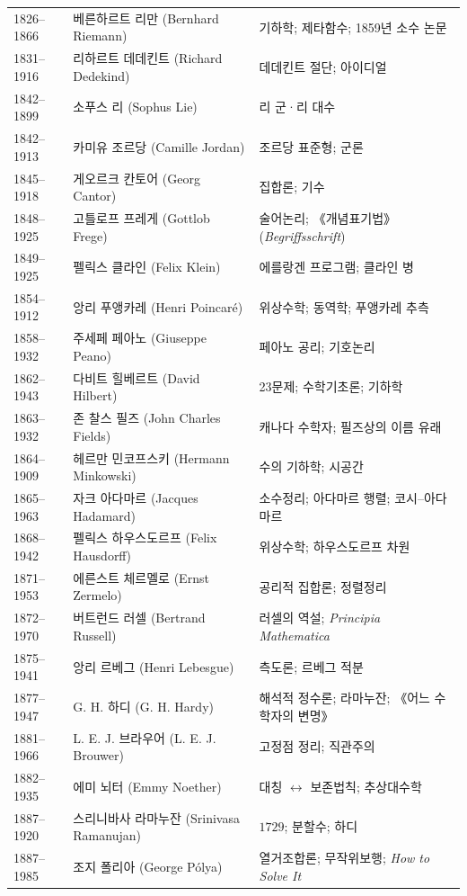 \begin{center}
\begin{longtable}{@{}L{0.16\textwidth}L{0.24\textwidth}L{0.52\textwidth}@{}}
1826--1866 & 베른하르트 리만 (Bernhard Riemann) & 기하학; 제타함수; 1859년 소수 논문\\
1831--1916 & 리하르트 데데킨트 (Richard Dedekind) & 데데킨트 절단; 아이디얼\\
1842--1899 & 소푸스 리 (Sophus Lie) & 리 군·리 대수\\
1842--1913 & 카미유 조르당 (Camille Jordan) & 조르당 표준형; 군론\\
1845--1918 & 게오르크 칸토어 (Georg Cantor) & 집합론; 기수\\
1848--1925 & 고틀로프 프레게 (Gottlob Frege) & 술어논리; 《개념표기법》 (\textit{Begriffsschrift})\\
1849--1925 & 펠릭스 클라인 (Felix Klein) & 에를랑겐 프로그램; 클라인 병\\
1854--1912 & 앙리 푸앵카레 (Henri Poincaré) & 위상수학; 동역학; 푸앵카레 추측\\
1858--1932 & 주세페 페아노 (Giuseppe Peano) & 페아노 공리; 기호논리\\
1862--1943 & 다비트 힐베르트 (David Hilbert) & 23문제; 수학기초론; 기하학\\
1863--1932 & 존 찰스 필즈 (John Charles Fields) & 캐나다 수학자; 필즈상의 이름 유래\\
1864--1909 & 헤르만 민코프스키 (Hermann Minkowski) & 수의 기하학; 시공간\\
1865--1963 & 자크 아다마르 (Jacques Hadamard) & 소수정리; 아다마르 행렬; 코시--아다마르\\
1868--1942 & 펠릭스 하우스도르프 (Felix Hausdorff) & 위상수학; 하우스도르프 차원\\
1871--1953 & 에른스트 체르멜로 (Ernst Zermelo) & 공리적 집합론; 정렬정리\\
1872--1970 & 버트런드 러셀 (Bertrand Russell) & 러셀의 역설; \textit{Principia Mathematica}\\
1875--1941 & 앙리 르베그 (Henri Lebesgue) & 측도론; 르베그 적분\\
1877--1947 & G. H. 하디 (G. H. Hardy) & 해석적 정수론; 라마누잔; 《어느 수학자의 변명》\\
1881--1966 & L. E. J. 브라우어 (L. E. J. Brouwer) & 고정점 정리; 직관주의\\
1882--1935 & 에미 뇌터 (Emmy Noether) & 대칭 $\leftrightarrow$ 보존법칙; 추상대수학\\
1887--1920 & 스리니바사 라마누잔 (Srinivasa Ramanujan) & $1729$; 분할수; 하디\\
1887--1985 & 조지 폴리아 (George Pólya) & 열거조합론; 무작위보행; \textit{How to Solve It}\\

\end{longtable}
\end{center}
